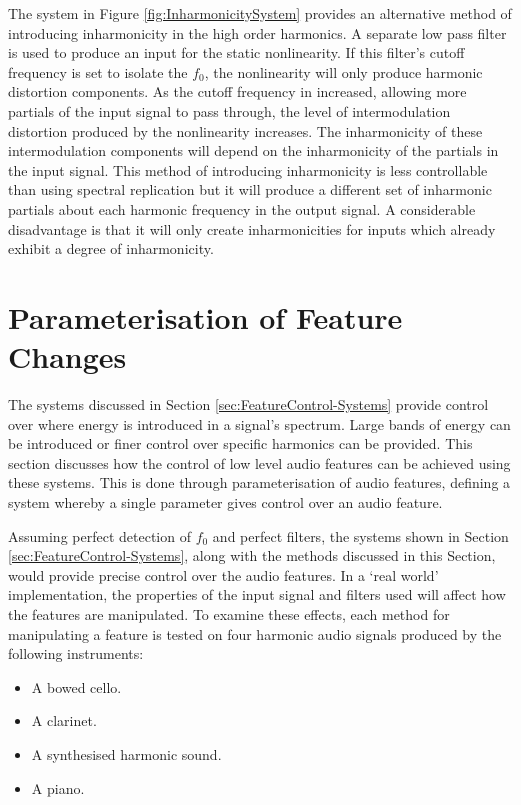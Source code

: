 		The system in Figure \ref{fig:InharmonicitySystem} provides an alternative method of introducing
		inharmonicity in the high order harmonics. A separate low pass filter is used to produce an input for the
		static nonlinearity. If this filter's cutoff frequency is set to isolate the $f_{0}$, the nonlinearity will
		only produce harmonic distortion components. As the cutoff frequency in increased, allowing more partials
		of the input signal to pass through, the level of intermodulation distortion produced by the nonlinearity
		increases. The inharmonicity of these intermodulation components will depend on the inharmonicity of the
		partials in the input signal. This method of introducing inharmonicity is less controllable than using
		spectral replication but it will produce a different set of inharmonic partials about each harmonic
		frequency in the output signal. A considerable disadvantage is that it will only create inharmonicities for
		inputs which already exhibit a degree of inharmonicity.

\section{Parameterisation of Feature Changes}
\label{sec:FeatureControl-Parameterisation}
	The systems discussed in Section \ref{sec:FeatureControl-Systems} provide control over where energy is introduced
	in a signal's spectrum. Large bands of energy can be introduced or finer control over specific harmonics can be
	provided. This section discusses how the control of low level audio features can be achieved using these systems.
	This is done through parameterisation of audio features, defining a system whereby a single parameter gives control
	over an audio feature.

	Assuming perfect detection of $f_{0}$ and perfect filters, the systems shown in Section
	\ref{sec:FeatureControl-Systems}, along with the methods discussed in this Section, would provide precise control
	over the audio features. In a `real world' implementation, the properties of the input signal and filters used will
	affect how the features are manipulated. To examine these effects, each method for manipulating a feature is tested
	on four harmonic audio signals produced by the following instruments:

	\begin{itemize}
		\item A bowed cello.
		\item A clarinet.
		\item A synthesised harmonic sound.
		\item A piano.
	\end{itemize}

